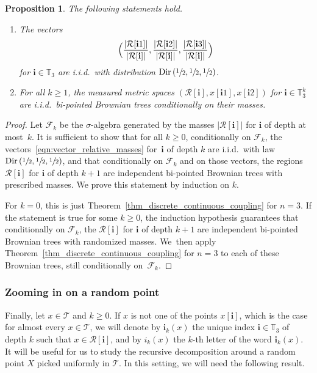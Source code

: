 \documentclass[JEP,XML,SOM,Unicode,NoFloatCountersInSection,published]{cedram}
\newenvironment{enumeratei}
{\bgroup\def\theenumi{\roman{enumi}}\def\theenumii{\arabic{enumii}}\begin{enumerate}}
{\end{enumerate}\egroup}
\newcommand{\Tt}{\mathcal{T}}
\newcommand{\Rr}{\mathcal{R}}
\newcommand{\ii}{\mathbf{i}}
\newcommand{\Dir}{\mathrm{Dir}}
\theoremstyle{plain}
\newtheorem{proposition}[theorem]{Proposition}
\theoremstyle{definition}
\begin{document}
\begin{proposition}\label{prop_independence_decomposition}
The following statements hold.
\begin{enumeratei}
\item The vectors\vspace*{-3pt}
\begin{equation}\label{eqn:vector_relative_masses}
\Bigl( \frac{\left| \Rr[\ii 1] \right|}{\left| \Rr[\ii ] \right|}, \frac{\left| \Rr[\ii 2] \right|}{\left| \Rr[\ii ] \right|}, \frac{\left| \Rr[\ii 3] \right|}{\left| \Rr[\ii ] \right|} \Bigr)
\end{equation}
for $\ii \in \mathbb{T}_3$ are i.i.d.\ with distribution $\Dir \left( \sfrac12, \sfrac12, \sfrac12 \right)$.
\item For all $k \geq 1$, the measured metric spaces $\left( \Rr[\ii ], x[\ii 1], x[\ii 2] \right)$ for $\ii \in \mathbb{T}_3^k$ are i.i.d.\ bi-pointed Brownian trees conditionally on their masses.
\end{enumeratei}
\end{proposition}

\begin{proof}
Let $\mathcal{F}_k$ be the $\sigma$-algebra generated by the masses $\left| \Rr[\ii ] \right|$ for $\ii$ of depth at most~$k$.
It is sufficient to show that for all $k \geq 0$, conditionally on $\mathcal{F}_k$, the vectors~\eqref{eqn:vector_relative_masses} for~$\ii $ of depth $k$ are i.i.d.\ with law $\Dir \left( \sfrac12, \sfrac12, \sfrac12 \right)$, and that conditionally on $\mathcal{F}_k$ and on those vectors, the regions $\Rr[\ii ]$ for $\ii $ of depth $k+1$ are independent bi-pointed Brownian trees with prescribed masses.
We prove this statement by induction on $k$.

For $k=0$, this is just Theorem~\ref{thm_discrete_continuous_coupling} for $n=3$. If the statement is true for some $k \geq 0$, the induction hypothesis guarantees that conditionally on $\mathcal{F}_k$, the $\Rr[\ii ]$ for $\ii $ of depth $k+1$ are independent bi-pointed Brownian trees with randomized masses. We~then apply Theorem~\ref{thm_discrete_continuous_coupling} for $n=3$ to each of these Brownian trees, still conditionally on~$\mathcal{F}_k$.
\end{proof}

\subsubsection*{Zooming in on a random point}
Finally, let $x \in \Tt$ and $k \geq 0$.
If $x$ is not one of the points $x[\ii]$, which is the case for almost every $x \in \Tt$, we will denote by $\ii_k(x)$ the unique index $\ii \in \mathbb{T}_3$ of depth $k$ such that $x \in \Rr[\ii ]$, and by $i_k(x)$ the $k$-th letter of the word $\ii _k(x)$.
It will be useful for us to study the recursive decomposition around a random point $X$ picked uniformly in $\Tt$.
In this setting, we will need the following result.
\end{document}
